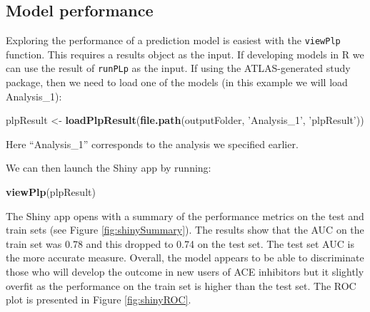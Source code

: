 \documentclass[11pt]{book}
\newenvironment{Shaded}{\begin{snugshade}}{\end{snugshade}}
\newcommand{\KeywordTok}[1]{\textcolor[rgb]{0.13,0.29,0.53}{\textbf{#1}}}
\newcommand{\NormalTok}[1]{#1}
\newcommand{\StringTok}[1]{\textcolor[rgb]{0.31,0.60,0.02}{#1}}
\theoremstyle{definition}
\theoremstyle{definition}
\theoremstyle{definition}
\theoremstyle{remark}
\begin{document}
\hypertarget{model-performance}{%
\subsection{Model performance}\label{model-performance}}

Exploring the performance of a prediction model is easiest with the \texttt{viewPlp} function. This requires a results object as the input. If developing models in R we can use the result of \texttt{runPLp} as the input. If using the ATLAS-generated study package, then we need to load one of the models (in this example we will load Analysis\_1): 

\begin{Shaded}
\begin{Highlighting}[]
\NormalTok{plpResult <-}\StringTok{ }\KeywordTok{loadPlpResult}\NormalTok{(}\KeywordTok{file.path}\NormalTok{(outputFolder, }
                                     \StringTok{'Analysis_1'}\NormalTok{, }
                                     \StringTok{'plpResult'}\NormalTok{))}
\end{Highlighting}
\end{Shaded}

Here ``Analysis\_1'' corresponds to the analysis we specified earlier.

We can then launch the Shiny app by running:

\begin{Shaded}
\begin{Highlighting}[]
\KeywordTok{viewPlp}\NormalTok{(plpResult)}
\end{Highlighting}
\end{Shaded}

The Shiny app opens with a summary of the performance metrics on the test and train sets (see Figure \ref{fig:shinySummary}). The results show that the AUC on the train set was 0.78 and this dropped to 0.74 on the test set. The test set AUC is the more accurate measure. Overall, the model appears to be able to discriminate those who will develop the outcome in new users of ACE inhibitors but it slightly overfit as the performance on the train set is higher than the test set. The ROC plot is presented in Figure \ref{fig:shinyROC}.
\end{document}
